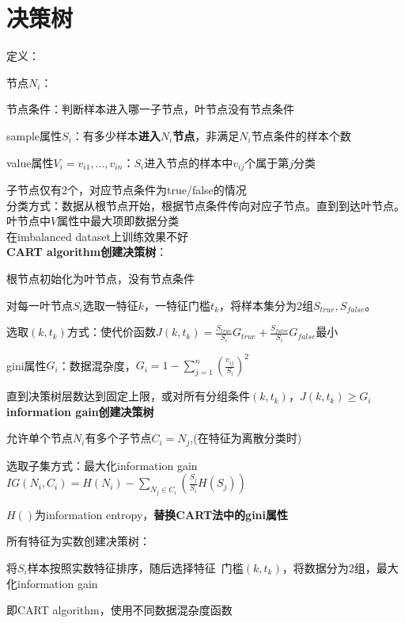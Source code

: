 \documentclass[UTF8]{ctexart}
\begin{document}
\section{决策树}
\noindent 定义：

  节点$N_i$：

  \quad 节点条件：判断样本进入哪一子节点，叶节点没有节点条件
  
  \quad sample属性$S_i$：有多少样本\textbf{进入$N_i$节点}，非满足$N_i$节点条件的样本个数

  \quad value属性$V_i = v_{i1}, ..., v_{in}$：$S_i$进入节点的样本中$v_{ij}$个属于第$j$分类
  
  \quad 子节点仅有2个，对应节点条件为true/false的情况\\
分类方式：数据从根节点开始，根据节点条件传向对应子节点。直到到达叶节点。叶节点中$V$属性中最大项即数据分类\\
在imbalanced dataset上训练效果不好\\
\textbf{CART algorithm创建决策树}：

  根节点初始化为叶节点，没有节点条件
  
  对每一叶节点$S_i$选取一特征$k$，一特征门槛$t_k$，将样本集分为2组$S_{true}, S_{false}$。
  
  \quad 选取$(k, t_k)$方式：使代价函数$J(k, t_k) = \frac{S_{true}}{S_i}G_{true} + \frac{S_{false}}{S_i}G_{false}$最小

  \quad gini属性$G_i$：数据混杂度，$G_i = 1-\sum_{j=1}^{n}(\frac{v_{ij}}{S_i})^2$

  直到决策树层数达到固定上限，或对所有分组条件$(k, t_k)$，$J(k, t_k) \geq G_i$\\
\textbf{information gain创建决策树}

  允许单个节点$N_i$有多个子节点$C_i = {N_j}$,(在特征为离散分类时)

  选取子集方式：最大化information gain $IG(N_i, C_i) = H(N_i) - \sum_{N_j \in C_i}(\frac{S_j}{S_i}H(S_j))$
  
  \quad $H()$为information entropy，\textbf{替换CART法中的gini属性}
  
  所有特征为实数创建决策树：
  
  \quad 将$S_i$样本按照实数特征排序，随后选择特征\ 门槛$(k, t_k)$，将数据分为2组，最大化information gain

  \quad 即CART algorithm，使用不同数据混杂度函数
  
\end{document}
